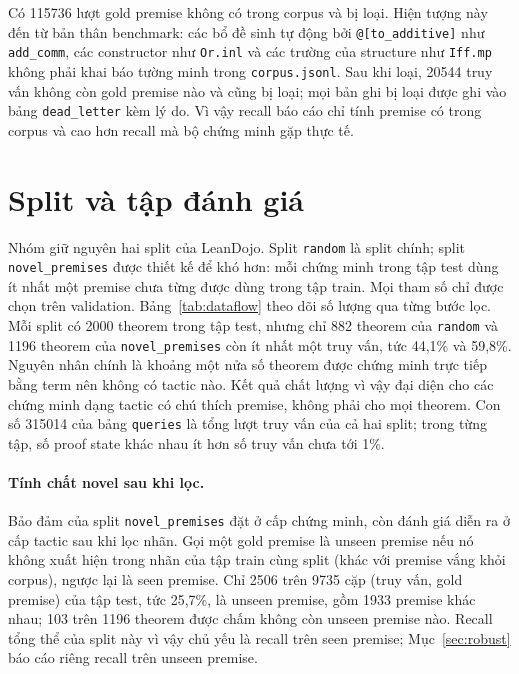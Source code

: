 \documentclass[11pt,a4paper,oneside]{report}
\newcommand{\code}[1]{\texttt{#1}}
\begin{document}
Có \num{115736} lượt gold premise không có trong corpus và bị loại. Hiện tượng này đến từ bản thân benchmark: các bổ đề sinh
tự động bởi \code{@[to\_additive]} như \code{add\_comm}, các constructor như \code{Or.inl} và các trường của structure như
\code{Iff.mp} không phải khai báo tường minh trong \code{corpus.jsonl}. Sau khi loại, \num{20544} truy vấn không còn gold
premise nào và cũng bị loại; mọi bản ghi bị loại được ghi vào bảng \code{dead\_letter} kèm lý do. Vì vậy recall báo cáo chỉ
tính premise có trong corpus và cao hơn recall mà bộ chứng minh gặp thực tế.

\section{Split và tập đánh giá}

Nhóm giữ nguyên hai split của LeanDojo. Split \code{random} là split chính; split \code{novel\_premises} được thiết kế
để khó hơn: mỗi chứng minh trong tập test dùng ít nhất một premise chưa từng được dùng trong tập train. Mọi tham
số chỉ được chọn trên validation. Bảng~\ref{tab:dataflow} theo dõi số lượng qua từng bước lọc. Mỗi split có \num{2000}
theorem trong tập test, nhưng chỉ 882 theorem của \code{random} và \num{1196} theorem của \code{novel\_premises} còn ít nhất một
truy vấn, tức 44,1\% và 59,8\%. Nguyên nhân chính là khoảng một nửa số theorem được chứng minh trực tiếp bằng term nên
không có tactic nào. Kết quả chất lượng vì vậy đại diện cho các chứng minh dạng tactic có chú thích premise, không phải
cho mọi theorem. Con số \num{315014} của bảng \code{queries} là tổng lượt truy vấn của cả hai split; trong từng tập, số
proof state khác nhau ít hơn số truy vấn chưa tới 1\%.



\paragraph{Tính chất novel sau khi lọc.} Bảo đảm của split \code{novel\_premises} đặt ở cấp chứng minh, còn đánh giá
diễn ra ở cấp tactic sau khi lọc nhãn. Gọi một gold premise là unseen premise nếu nó không xuất hiện trong nhãn của
tập train cùng split (khác với premise vắng khỏi corpus), ngược lại là seen premise. Chỉ \num{2506} trên \num{9735} cặp
(truy vấn, gold premise) của tập test, tức 25,7\%, là unseen premise, gồm \num{1933} premise khác nhau; 103 trên
\num{1196} theorem được chấm không còn unseen premise nào. Recall tổng thể của split này vì vậy chủ yếu là recall trên
seen premise; Mục~\ref{sec:robust} báo cáo riêng recall trên unseen premise.
\end{document}
